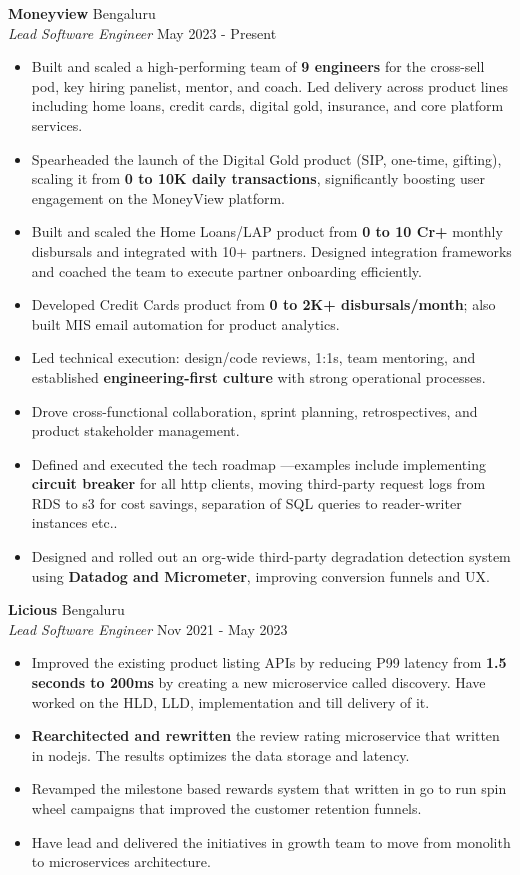 \documentclass[a4paper]{article}
\begin{document}
\textbf{Moneyview} \hfill Bengaluru\\
\textit{Lead Software Engineer} \hfill May 2023 - Present\\
\vspace{-1mm}
\begin{itemize} \itemsep 1pt
	\item Built and scaled a high-performing team of \textbf{9 engineers} for the cross-sell pod, key hiring panelist, mentor, and coach. Led delivery across product lines including home loans, credit cards, digital gold, insurance, and core platform services.
	\item Spearheaded the launch of the Digital Gold product (SIP, one-time, gifting), scaling it from \textbf{0 to 10K daily transactions}, significantly boosting user engagement on the MoneyView platform.
	\item Built and scaled the Home Loans/LAP product from \textbf{0 to 10 Cr+} monthly disbursals and integrated with 10+ partners. Designed integration frameworks and coached the team to execute partner onboarding efficiently.
	\item Developed Credit Cards product from \textbf{0 to 2K+ disbursals/month}; also built MIS email automation for product analytics.
	\item Led technical execution: design/code reviews, 1:1s, team mentoring, and established \textbf{engineering-first culture} with strong operational processes.
	\item Drove cross-functional collaboration, sprint planning, retrospectives, and product stakeholder management.
	\item Defined and executed the tech roadmap —examples include implementing \textbf{circuit breaker} for all http clients, moving third-party request logs from RDS to s3 for cost savings, separation of SQL queries to reader-writer instances etc..
	\item Designed and rolled out an org-wide third-party degradation detection system using \textbf{Datadog and Micrometer}, improving conversion funnels and UX.
\end{itemize}
\textbf{Licious} \hfill Bengaluru\\
\textit{Lead Software Engineer} \hfill Nov 2021 - May 2023\\
\vspace{-1mm}
\begin{itemize} \itemsep 1pt
	\item Improved the existing product listing APIs by reducing P99 latency from \textbf{1.5 seconds to 200ms} by creating a new microservice called discovery. Have worked on the HLD, LLD, implementation and till delivery of it.
	\item \textbf{Rearchitected and rewritten} the review rating microservice that written in nodejs. The results optimizes the data storage and latency.
	\item Revamped the milestone based rewards system that written in go to run spin wheel campaigns that improved the customer retention funnels.
	\item Have lead and delivered the initiatives in growth team to move from monolith to microservices architecture.
\end{itemize}
\end{document}
